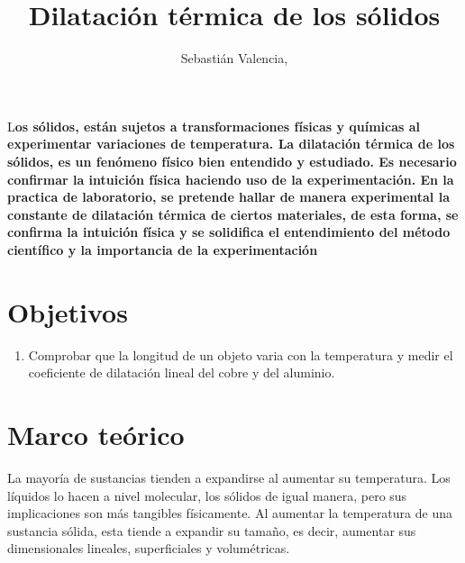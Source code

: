 \documentclass[DIV=calc, paper=a4, fontsize=11pt, twocolumn, spanish]{scrartcl}	 %
\title{Dilatación térmica de los sólidos} %
\author{Sebastián Valencia, } %
\date{} %
\newcommand{\initial}[1]{ %
\lettrine[lines=3,lhang=0.3,nindent=0em]{
\color{DarkGoldenrod}
{\textsf{#1}}}{}}
\begin{document}
\maketitle %

\thispagestyle{fancy} %


\initial{L}\textbf{os sólidos, están sujetos a transformaciones físicas y químicas al experimentar variaciones de temperatura. La dilatación térmica de los sólidos, es un fenómeno físico bien entendido y estudiado. Es necesario confirmar la intuición física haciendo uso de la experimentación. En la practica de laboratorio, se pretende hallar de manera experimental la constante de dilatación térmica de ciertos materiales, de esta forma, se confirma la intuición física y se  solidifica el entendimiento del método científico y la importancia de la experimentación}


\section*{Objetivos}

\begin{enumerate}
\item Comprobar que la longitud de un objeto varia con la temperatura y medir el coeficiente de dilatación lineal del cobre y del aluminio.
\end{enumerate}


\section*{Marco teórico}

La mayoría de sustancias tienden a expandirse al aumentar su temperatura. Los líquidos lo hacen a nivel molecular, los sólidos de igual manera, pero sus implicaciones son más tangibles físicamente. Al aumentar la temperatura de una sustancia sólida, esta tiende a expandir su tamaño, es decir, aumentar sus dimensionales lineales, superficiales y volumétricas.
\end{document}
